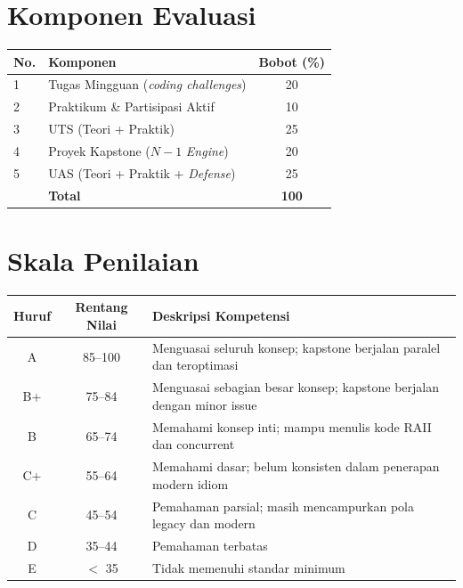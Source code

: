 \documentclass[12pt,a4paper]{article}
\begin{document}
\newpage
\section*{Komponen Evaluasi}

\begin{center}
\begin{tabular}{@{}llc@{}}
    \toprule
    \textbf{No.} & \textbf{Komponen} & \textbf{Bobot (\%)} \\
    \midrule
    1 & Tugas Mingguan (\textit{coding challenges}) & 20 \\
    2 & Praktikum \& Partisipasi Aktif & 10 \\
    3 & UTS (Teori + Praktik) & 25 \\
    4 & Proyek Kapstone ($N-1$ \textit{Engine}) & 20 \\
    5 & UAS (Teori + Praktik + \textit{Defense}) & 25 \\
    \midrule
    & \textbf{Total} & \textbf{100} \\
    \bottomrule
\end{tabular}
\end{center}

\section*{Skala Penilaian}

\begin{center}
\begin{tabular}{@{}ccl@{}}
    \toprule
    \textbf{Huruf} & \textbf{Rentang Nilai} & \textbf{Deskripsi Kompetensi} \\
    \midrule
    A  & 85--100 & Menguasai seluruh konsep; kapstone berjalan paralel dan teroptimasi \\
    B+ & 75--84  & Menguasai sebagian besar konsep; kapstone berjalan dengan minor issue \\
    B  & 65--74  & Memahami konsep inti; mampu menulis kode RAII dan concurrent \\
    C+ & 55--64  & Memahami dasar; belum konsisten dalam penerapan modern idiom \\
    C  & 45--54  & Pemahaman parsial; masih mencampurkan pola legacy dan modern \\
    D  & 35--44  & Pemahaman terbatas \\
    E  & $<$ 35  & Tidak memenuhi standar minimum \\
    \bottomrule
\end{tabular}
\end{center}
\end{document}
